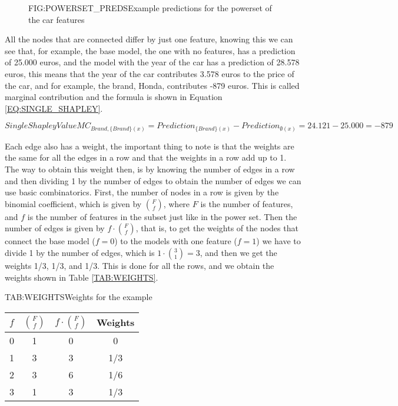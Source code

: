\begin{figure}[Powerset With Predictions]{FIG:POWERSET_PREDS}{Example predictions for the powerset of the car features}
\end{figure}

All the nodes that are connected differ by just one feature, knowing this we can see that, for example, the base model, the one with no features, has a prediction of 25.000 euros, and the model with the year of the car has a prediction of 28.578 euros, this means that the year of the car contributes 3.578 euros to the price of the car, and for example, the brand, Honda, contributes -879 euros. This is called marginal contribution and the formula is shown in Equation \ref{EQ:SINGLE_SHAPLEY}.

\begin{equation}[EQ:SINGLE_SHAPLEY]{Single Shapley Value}
    MC_{Brand, \{Brand\}(x)} = Prediction_{\{Brand\}(x)} - Prediction_{\emptyset(x)} = 24.121 - 25.000 = -879
\end{equation}

Each edge also has a weight, the important thing to note is that the weights are the same for all the edges in a row and that the weights in a row add up to 1. The way to obtain this weight then, is by knowing the number of edges in a row and then dividing 1 by the number of edges 
to obtain the number of edges we can use basic combinatorics. First, the number of nodes in a row is given by the binomial coefficient, which is given by $F \choose f$, where $F$ is the number of features, and $f$ is the number of features in the subset just like in the power set. Then the number of edges is given by $f \cdot {F \choose f}$, that is, to get the weights of the nodes that connect the base model ($f=0$) to the models with one feature ($f=1$) we have to divide 1 by the number of edges, which is $1 \cdot {3 \choose 1} = 3$, and then we get the weights 1/3, 1/3, and 1/3. This is done for all the rows, and we obtain the weights shown in Table \ref{TAB:WEIGHTS}.

\begin{table}[Weights]{TAB:WEIGHTS}{Weights for the example}
    \begin{tabular}{|c|c|c|c|}
        \hline
        $f$ & $F \choose f$ & $f \cdot {F \choose f}$ & Weights \\
        \hline
        0 & 1 & 0 & 0 \\
        1 & 3 & 3 & 1/3\\
        2 & 3 & 6 & 1/6\\
        3 & 1 & 3 & 1/3\\
        \hline
    \end{tabular}
\end{table}


